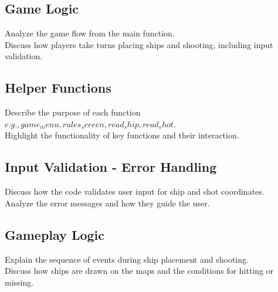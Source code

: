 \subsection{Game Logic}
Analyze the game flow from the main function.\\

Discuss how players take turns placing ships and shooting, including input validation.

\subsection{Helper Functions}
Describe the purpose of each function \(e.g., game_menu, rules_screen, read_ship, read_shot\).\\

Highlight the functionality of key functions and their interaction.

\subsection{Input Validation - Error Handling}
Discuss how the code validates user input for ship and shot coordinates. \\

Analyze the error messages and how they guide the user.

\subsection{Gameplay Logic}
Explain the sequence of events during ship placement and shooting.\\

Discuss how ships are drawn on the maps and the conditions for hitting or missing.